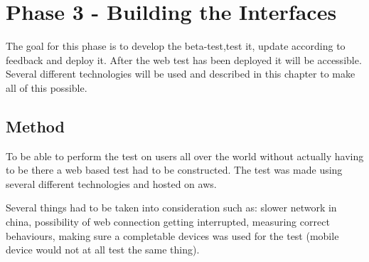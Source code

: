 
\chapter{Phase 3 - Building the Interfaces} %

\label{Chapter6} %

The goal for this phase is to develop the beta-test,test it, update according to feedback and deploy it. After the web test has been deployed it will be accessible. Several different technologies will be used and described in this chapter to make all of this possible.
\section{Method}
To be able to perform the test on users all over the world without actually having to be there a web based test had to be constructed. The test was made using several different technologies and hosted on aws. 

Several things had to be taken into consideration such as: slower network in china, possibility of web connection getting interrupted, measuring correct behaviours, making sure a completable devices was used for the test (mobile device would not at all test the same thing).


